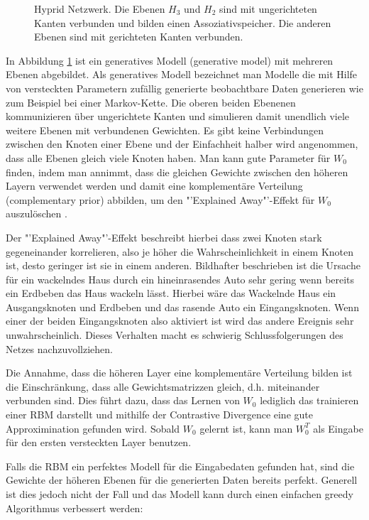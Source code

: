 \documentclass[12pt]{article}
\begin{document}
\begin{figure}[H]
	\center
	
	\caption{Hyprid Netzwerk. Die Ebenen $H_3$ und $H_2$ sind mit ungerichteten Kanten verbunden und bilden einen Assoziativspeicher. Die anderen Ebenen sind mit gerichteten Kanten verbunden.}
	\label{Netz}
\end{figure}

In Abbildung \ref{Netz} ist ein generatives Modell (generative model)  mit mehreren Ebenen abgebildet. Als generatives Modell bezeichnet man Modelle die mit Hilfe von versteckten Parametern zufällig generierte beobachtbare Daten generieren wie zum Beispiel bei einer Markov-Kette. Die oberen beiden Ebenenen kommunizieren über ungerichtete Kanten und simulieren damit unendlich viele weitere Ebenen mit verbundenen Gewichten. Es gibt keine Verbindungen zwischen den Knoten einer Ebene und der Einfachheit halber wird angenommen, dass alle Ebenen gleich viele Knoten haben. Man kann gute Parameter für $W_0$ finden, indem man annimmt, dass die gleichen Gewichte zwischen den höheren Layern verwendet werden und damit eine komplementäre Verteilung (complementary prior) abbilden, um den "'Explained Away"'-Effekt für $W_0$ auszulöschen \cite{learning}.

Der "'Explained Away"'-Effekt beschreibt hierbei dass zwei Knoten stark gegeneinander korrelieren, also je höher die Wahrscheinlichkeit in einem Knoten ist, desto geringer ist sie in einem anderen. Bildhafter beschrieben ist die Ursache für ein wackelndes Haus durch ein hineinrasendes Auto sehr gering wenn bereits ein Erdbeben das Haus wackeln lässt. Hierbei wäre das Wackelnde Haus ein Ausgangsknoten und Erdbeben und das rasende Auto ein Eingangsknoten. Wenn einer der beiden Eingangsknoten also aktiviert ist wird das andere Ereignis sehr unwahrscheinlich. Dieses Verhalten macht es schwierig Schlussfolgerungen des Netzes nachzuvollziehen.  

Die Annahme, dass die höheren Layer eine komplementäre Verteilung bilden ist die Einschränkung, dass alle Gewichtsmatrizzen gleich, d.h. miteinander verbunden sind. Dies führt dazu, dass das Lernen von $W_0$ lediglich das trainieren einer RBM darstellt und mithilfe der Contrastive Divergence eine gute Approximination gefunden wird. Sobald $W_0$ gelernt ist, kann man $W^T_0$ als Eingabe für den ersten versteckten Layer benutzen.

Falls die RBM ein perfektes Modell für die Eingabedaten gefunden hat, sind die Gewichte der höheren Ebenen für die generierten Daten bereits perfekt. Generell ist dies jedoch nicht der Fall und das Modell kann durch einen einfachen greedy Algorithmus verbessert werden:
\end{document}
